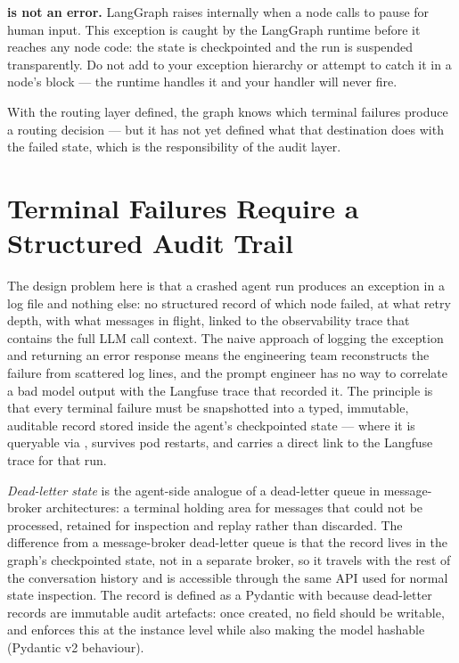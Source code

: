 \begin{warningbox}
  \textbf{ is not an error.}
  LangGraph raises  internally when a node calls
   to pause for human input. This exception is caught
  by the LangGraph runtime before it reaches any node code: the state is
  checkpointed and the run is suspended transparently. Do not add
   to your exception hierarchy or attempt to catch it
  in a node's  block --- the runtime handles it and your
  handler will never fire.
\end{warningbox}

With the routing layer defined, the graph knows which terminal failures
produce a  routing decision --- but it has not yet
defined what that destination does with the failed state, which is the
responsibility of the audit layer.

\section{Terminal Failures Require a Structured Audit Trail}
\label{sec:dead-letter-state}

The design problem here is that a crashed agent run produces an exception
in a log file and nothing else: no structured record of which node failed,
at what retry depth, with what messages in flight, linked to the
observability trace that contains the full LLM call context. The naive
approach of logging the exception and returning an error response means the
engineering team reconstructs the failure from scattered log lines, and the
prompt engineer has no way to correlate a bad model output with the Langfuse
trace that recorded it. The principle is that every terminal failure must be
snapshotted into a typed, immutable, auditable record stored inside the
agent's checkpointed state --- where it is queryable via
, survives pod restarts, and carries a direct
link to the Langfuse trace for that run.

\emph{Dead-letter state} is the agent-side analogue of a dead-letter queue
in message-broker architectures: a terminal holding area for messages that
could not be processed, retained for inspection and replay rather than
discarded. The difference from a message-broker dead-letter queue is that
the record lives in the graph's checkpointed state, not in a separate
broker, so it travels with the rest of the conversation history and is
accessible through the same  API used for normal state
inspection. The record is defined as a Pydantic  with
 because dead-letter records are immutable
audit artefacts: once created, no field should be writable, and
 enforces this at the instance level while also making
the model hashable (Pydantic v2 behaviour).

